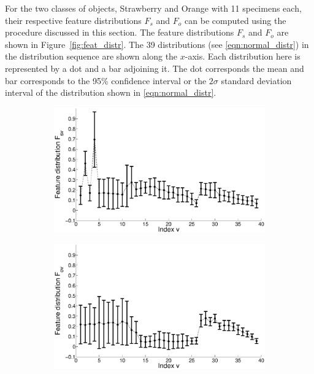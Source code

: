\documentclass {udthesis}
\begin{document}
For the two classes of objects, Strawberry and Orange with 11 specimens each, their respective feature distributions $F_s$ and $F_o$ can be computed using the procedure discussed in this section. The feature distributions $F_s$ and $F_o$ are shown in Figure~\ref{fig:feat_distr}. The 39 distributions (see \eqref{eqn:normal_distr}) in the distribution sequence are shown along the $x$-axis. Each distribution here is represented by a dot and a bar adjoining it. The dot corresponds the mean and bar corresponds to the 95\% confidence interval or the $2\sigma$ standard deviation interval of the distribution shown in \eqref{eqn:normal_distr}.
%
\begin{figure}
  \centering
  \begin{subfigure}[]{0.8\textwidth}
      \includegraphics[width=\textwidth]{strawberry_learning_feature_distribution}
      \caption{}
      \label{fig:feat_distr_strawberry}
  \end{subfigure}
  \begin{subfigure}[]{0.8\textwidth}
      \includegraphics[width=\textwidth]{orange_learning_feature_distribution}

\end{subfigure}
\end{figure}
\end{document}
